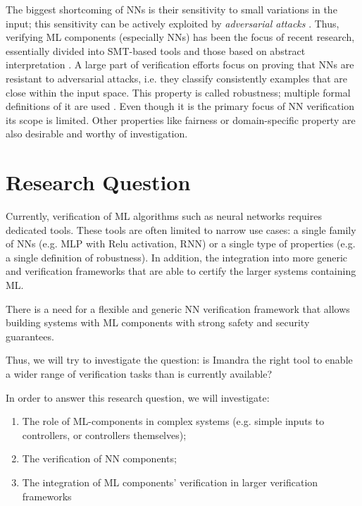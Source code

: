 \documentclass[]{article}
\begin{document}
The biggest shortcoming of NNs is their sensitivity to small variations in the input; this sensitivity can be actively exploited by \emph{adversarial attacks} \cite{carlini_towards_2017}. Thus, verifying ML components (especially NNs) has been the focus of recent research, essentially divided into SMT-based tools \cite{katz_reluplex_2017} and those based on abstract interpretation \cite{singh_abstract_2019, elboher_abstraction-based_2020}. A large part of verification efforts focus on proving that NNs are resistant to adversarial attacks, i.e. they classify consistently examples that are close within the input space. This property is called robustness; multiple formal definitions of it are used \cite{casadio_property-driven_2021}. Even though it is the primary focus of NN verification its scope is limited. Other properties like fairness or domain-specific property are also desirable and worthy of investigation.


\section{Research Question}

Currently, verification of ML algorithms such as neural networks requires dedicated tools. These tools are often limited to narrow use cases: a single family of NNs (e.g. MLP with Relu activation, RNN) or a single type of properties (e.g. a single definition of robustness). In addition, the integration into more generic and verification frameworks that are able to certify the larger systems containing ML.

There is a need for a flexible and generic NN verification framework that allows building systems with ML components with strong safety and security guarantees.

Thus, we will try to investigate the question: is Imandra the right tool to enable a wider range of verification tasks than is currently available?

In order to answer this research question, we will investigate:
\begin{enumerate}
	\item The role of ML-components in complex systems (e.g. simple inputs to controllers, or controllers themselves);
	\item The verification of NN components;
	\item The integration of ML components' verification in larger verification frameworks
\end{enumerate}
\end{document}
